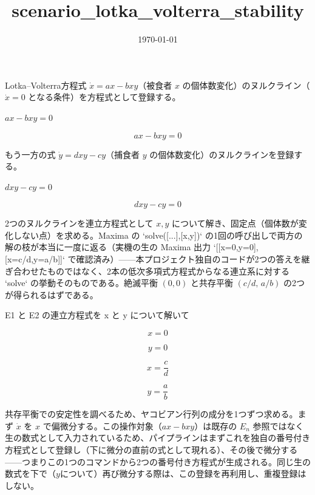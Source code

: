 \documentclass[dvipdfmx,a4paper,11pt]{jsarticle}
\title{scenario\_lotka\_volterra\_stability}
\date{\today}
\begin{document}
\maketitle

Lotka–Volterra方程式 $\dot x=ax-bxy$（被食者 $x$ の個体数変化）のヌルクライン（$\dot x=0$ となる条件）を方程式として登録する。

$a x - b x y = 0$

\begin{equation}
  a x - b x y = 0
  \label{eq:E1}
\end{equation}

もう一方の式 $\dot y=dxy-cy$（捕食者 $y$ の個体数変化）のヌルクラインを登録する。

$d x y - c y = 0$

\begin{equation}
  d x y - c y = 0
  \label{eq:E2}
\end{equation}

2つのヌルクラインを連立方程式として $x,y$ について解き、固定点（個体数が変化しない点）を求める。Maxima の `solve([...],[x,y])` の1回の呼び出しで両方の解の枝が本当に一度に返る（実機の生の Maxima 出力 `[[x=0,y=0],[x=c/d,y=a/b]]` で確認済み）——本プロジェクト独自のコードが2つの答えを継ぎ合わせたものではなく、2本の低次多項式方程式からなる連立系に対する `solve` の挙動そのものである。絶滅平衡 $(0,0)$ と共存平衡 $(c/d,\,a/b)$ の2つが得られるはずである。

E1 と E2 の連立方程式を x と y について解いて

\begin{equation}
  x = 0
  \label{eq:E3}
\end{equation}

\begin{equation}
  y = 0
  \label{eq:E4}
\end{equation}

\begin{equation}
  x = \frac{c}{d}
  \label{eq:E5}
\end{equation}

\begin{equation}
  y = \frac{a}{b}
  \label{eq:E6}
\end{equation}

共存平衡での安定性を調べるため、ヤコビアン行列の成分を1つずつ求める。まず $\dot x$ を $x$ で偏微分する。この操作対象（$ax-bxy$）は既存の $E_n$ 参照ではなく生の数式として入力されているため、パイプラインはまずこれを独自の番号付き方程式として登録し（下に微分の直前の式として現れる）、その後で微分する——つまりこの1つのコマンドから2つの番号付き方程式が生成される。同じ生の数式を下で（$y$について）再び微分する際は、この登録を再利用し、重複登録はしない。
\end{document}
